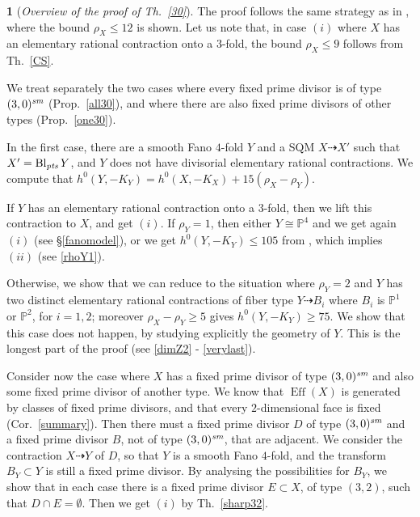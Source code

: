 \documentclass[a4paper,12pt]{amsart}
\theoremstyle{definition}
\newtheorem{prg}[thm]{}
\numberwithin{figure}{section}
\numberwithin{table}{section}
\newcommand{\pr}{\mathbb{P}}
\newcommand{\Eff}{\operatorname{Eff}}
\newcommand{\Bl}{\operatorname{Bl}}
\newcommand{\sm}{\text{\it sm}}
\newcommand{\pts}{\text{\it pts}}
\begin{document}
\begin{prg}[\em Overview of the proof of Th.~\ref{30}]\label{overview30}
The proof follows the same strategy as in \cite{blowup}, where the bound $\rho_X\leq 12$ is shown. Let us note that, in case $(i)$ where $X$ has an elementary rational contraction onto a $3$-fold, the bound $\rho_X\leq 9$ follows from Th.~\ref{CS}.

We treat separately the two cases where every fixed prime divisor is of type $(3,0)^{\sm}$ (Prop.~\ref{all30}), and where there are also fixed prime divisors of other types (Prop.~\ref{one30}).

In the first case, there are a smooth Fano $4$-fold $Y$ and a SQM $X\dasharrow X'$ such that $X'=\Bl_{\pts}Y$, and $Y$ does not have divisorial elementary rational contractions. We compute that $h^0(Y,-K_Y)=h^0(X,-K_X)+15(\rho_X-\rho_Y)$.  

If $Y$ has an elementary rational contraction onto a $3$-fold, then we lift this contraction to $X$, and get $(i)$.
If $\rho_Y=1$, then  either $Y\cong\pr^4$ and we get again $(i)$ (see \S\ref{fanomodel}), or we get $h^0(Y,-K_Y)\leq 105$ from \cite{blowup}, which implies
$(ii)$ (see \ref{rhoY1}).

Otherwise, we show that we can reduce to the situation where
 $\rho_Y=2$ and $Y$ has two distinct elementary rational contractions of fiber type $Y\dasharrow B_i$ where $B_i$ is $\pr^1$ or $\pr^2$, for $i=1,2$; moreover $\rho_X-\rho_Y\geq 5$ gives 
$h^0(Y,-K_Y)\geq 75$.
We show that this case does not happen, by studying explicitly the geometry of $Y$.
 This is the longest part of the proof (see \ref{dimZ2} - \ref{verylast}).

\medskip

Consider now the case where $X$ has a fixed prime divisor of type $(3,0)^{\sm}$ and also some fixed prime divisor of another type. We know that $\Eff(X)$ is generated by classes of fixed prime divisors, and that every $2$-dimensional face is fixed (Cor.~\ref{summary}). Then there must a  fixed prime divisor $D$ of type $(3,0)^{\sm}$ and a fixed prime divisor $B$, not of type $(3,0)^{\sm}$, that are adjacent. We consider the contraction $X\dasharrow Y$ of $D$, so that $Y$ is a smooth Fano $4$-fold, and the transform $B_Y\subset Y$ is still a fixed prime divisor. By analysing 
 the possibilities for $B_Y$, we show that in each case there is a fixed prime divisor $E\subset X$, of type $(3,2)$, such that $D\cap E=\emptyset$. Then we get $(i)$ by Th.~\ref{sharp32}.
\end{prg}
\end{document}

